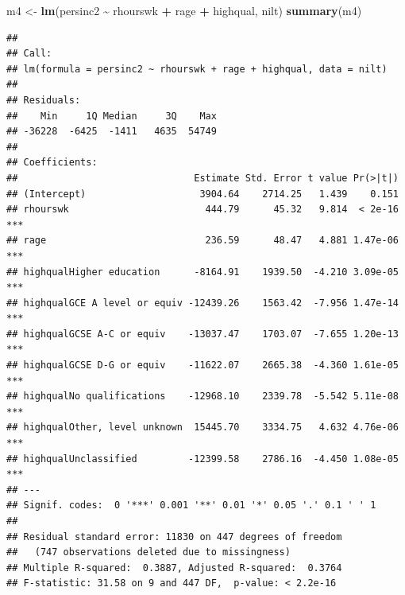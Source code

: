 \documentclass[
]{book}
\newenvironment{Shaded}{\begin{snugshade}}{\end{snugshade}}
\newcommand{\FunctionTok}[1]{\textcolor[rgb]{0.13,0.29,0.53}{\textbf{#1}}}
\newcommand{\NormalTok}[1]{#1}
\newcommand{\OtherTok}[1]{\textcolor[rgb]{0.56,0.35,0.01}{#1}}
\newcommand{\SpecialCharTok}[1]{\textcolor[rgb]{0.81,0.36,0.00}{\textbf{#1}}}
\begin{document}
\begin{Shaded}
\begin{Highlighting}[]
\NormalTok{m4 }\OtherTok{\textless{}{-}} \FunctionTok{lm}\NormalTok{(persinc2 }\SpecialCharTok{\textasciitilde{}}\NormalTok{ rhourswk }\SpecialCharTok{+}\NormalTok{ rage }\SpecialCharTok{+}\NormalTok{ highqual, nilt)}
\FunctionTok{summary}\NormalTok{(m4)}
\end{Highlighting}
\end{Shaded}

\begin{verbatim}
## 
## Call:
## lm(formula = persinc2 ~ rhourswk + rage + highqual, data = nilt)
## 
## Residuals:
##    Min     1Q Median     3Q    Max 
## -36228  -6425  -1411   4635  54749 
## 
## Coefficients:
##                               Estimate Std. Error t value Pr(>|t|)    
## (Intercept)                    3904.64    2714.25   1.439    0.151    
## rhourswk                        444.79      45.32   9.814  < 2e-16 ***
## rage                            236.59      48.47   4.881 1.47e-06 ***
## highqualHigher education      -8164.91    1939.50  -4.210 3.09e-05 ***
## highqualGCE A level or equiv -12439.26    1563.42  -7.956 1.47e-14 ***
## highqualGCSE A-C or equiv    -13037.47    1703.07  -7.655 1.20e-13 ***
## highqualGCSE D-G or equiv    -11622.07    2665.38  -4.360 1.61e-05 ***
## highqualNo qualifications    -12968.10    2339.78  -5.542 5.11e-08 ***
## highqualOther, level unknown  15445.70    3334.75   4.632 4.76e-06 ***
## highqualUnclassified         -12399.58    2786.16  -4.450 1.08e-05 ***
## ---
## Signif. codes:  0 '***' 0.001 '**' 0.01 '*' 0.05 '.' 0.1 ' ' 1
## 
## Residual standard error: 11830 on 447 degrees of freedom
##   (747 observations deleted due to missingness)
## Multiple R-squared:  0.3887, Adjusted R-squared:  0.3764 
## F-statistic: 31.58 on 9 and 447 DF,  p-value: < 2.2e-16
\end{verbatim}
\end{document}
